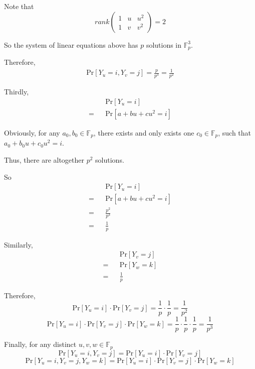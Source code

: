 			Note that
			\[
				rank
				\left(
				\begin{matrix}
					1 & u & u^2 \\
					1 & v & v^2
				\end{matrix}
				\right) = 2
			\]
			
			So the system of linear equations above has $p$ solutions in $\mathbb{F}^{3}_{p}$.
			
			Therefore,
			\begin{eqnarray*}
				\text{Pr}[Y_u = i, Y_v = j]
				= \frac{p}{p^3}
				= \frac{1}{p^2}
			\end{eqnarray*}
			
			Thirdly,
			\begin{eqnarray*}
				&&\text{Pr}[Y_u = i] \\
				= &&\text{Pr}[a + bu + cu^2 = i]
			\end{eqnarray*}
			
			Obviously, for any $a_0, b_0 \in \mathbb{F}_{p}$, there exists and only exists one $c_0 \in \mathbb{F}_{p}$, such that $a_0 + b_0 u + c_0 u^2 = i$.
			
			Thus, there are altogether $p^2$ solutions.
			
			So
			\begin{eqnarray*}
				&&\text{Pr}[Y_u = i] \\
				= &&\text{Pr}[a + bu + cu^2 = i] \\
				= &&\frac{p^2}{p^3} \\
				= &&\frac{1}{p}
			\end{eqnarray*}
			
			Similarly,
			\begin{eqnarray*}
				&&\text{Pr}[Y_v = j] \\
				= &&\text{Pr}[Y_w = k] \\
				= &&\frac{1}{p}
			\end{eqnarray*}
			
			Therefore,
			\[
				\text{Pr}[Y_u = i] \cdot \text{Pr}[Y_v = j] = \frac{1}{p} \cdot \frac{1}{p} = \frac{1}{p^2}
			\]
			\[
				\text{Pr}[Y_u = i] \cdot \text{Pr}[Y_v = j] \cdot \text{Pr}[Y_w = k] = \frac{1}{p} \cdot \frac{1}{p} \cdot \frac{1}{p} = \frac{1}{p^3}
			\]
			
			Finally, for any distinct $u, v, w \in \mathbb{F}_{p}$
			\[
				\text{Pr}[Y_u = i, Y_v = j] = \text{Pr}[Y_u = i] \cdot \text{Pr}[Y_v = j]
			\]
			\[
				\text{Pr}[Y_u = i, Y_v = j, Y_w = k] = \text{Pr}[Y_u = i] \cdot \text{Pr}[Y_v = j] \cdot \text{Pr}[Y_w = k]
			\]
			
